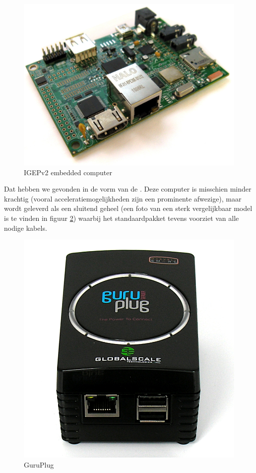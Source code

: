 \begin{figure}
	\includegraphics[width=\textwidth]{afbeeldingen/IGEPv2}
	\caption{IGEPv2 embedded computer}
	\label{fig:hw:kiosk:igepv2}
\end{figure}

Dat hebben we gevonden in de vorm van de . Deze computer is misschien minder krachtig (vooral acceleratiemogelijkheden zijn een prominente afwezige), maar wordt geleverd als een sluitend geheel (een foto van een sterk vergelijkbaar model is te vinden in figuur \ref{fig:hw:kiosk:guruplug}) waarbij het standaardpakket tevens voorziet van alle nodige kabels.

\begin{figure}
	\begin{center}
	\includegraphics[width=0.75 \textwidth]{afbeeldingen/GuruPlug}	
	\end{center}
	\caption{GuruPlug}
	\label{fig:hw:kiosk:guruplug}
\end{figure}

